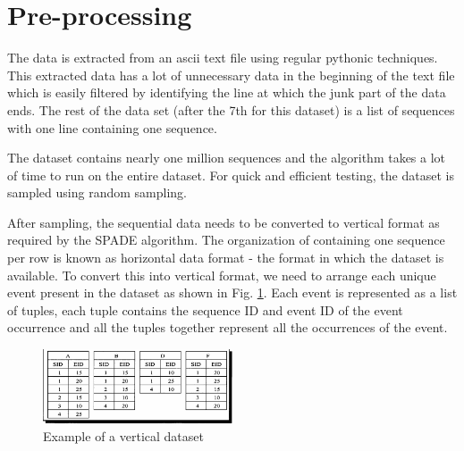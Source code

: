 \section{Pre-processing}

The data is extracted from an ascii text file using regular pythonic techniques. This extracted data has a lot of unnecessary data in the beginning of the text file which is easily filtered by identifying the line at which the junk part of the data ends. The rest of the data set (after the 7th for this dataset) is a list of sequences with one line containing one sequence.

The dataset contains nearly one million sequences and the algorithm takes a lot of time to run on the entire dataset. For quick and efficient testing, the dataset is sampled using random sampling.

After sampling, the sequential data needs to be converted to vertical format as required by the SPADE algorithm. The organization of containing one sequence per row is known as horizontal data format - the format in which the dataset is available. To convert this into vertical format, we need to arrange each unique event present in the dataset as shown in Fig. \ref{vertical}. Each event is represented as a list of tuples, each tuple contains the sequence ID and event ID of the event occurrence and all the tuples together represent all the occurrences of the event.

\begin{figure}[h]
    \centerline{\includegraphics[width=0.5\textwidth]{figures/vertical_data.png}}
    \caption{Example of a vertical dataset}
    \label{vertical}
\end{figure}